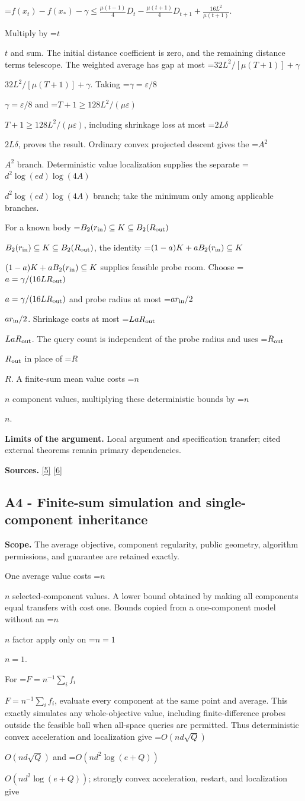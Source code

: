 \documentclass[10pt,a4paper]{article}
\newcommand{\AtlasMath}[1]{\par\begingroup\centering\setbox0=\hbox{$\displaystyle #1$}\ifdim\wd0>1.4\linewidth\typeout{ATLAS WIDE FORMULA: \the\wd0}\fi\ifdim\wd0>\linewidth\resizebox{\linewidth}{!}{\box0}\else\box0\fi\par\endgroup}
\newcommand{\AtlasInlineMath}[1]{\begingroup\setbox0=\hbox{$#1$}\ifdim\wd0>.4\linewidth\endgroup\AtlasMath{#1}\else\endgroup$#1$\fi}
\begin{document}
\AtlasMath{f(x_t)-f(x_*)-\gamma\le\frac{\mu(t-1)}4D_t-\frac{\mu(t+1)}4D_{t+1}+\frac{16L^2}{\mu(t+1)}.}

Multiply by \AtlasInlineMath{t} and sum. The initial distance coefficient is zero, and the remaining distance terms telescope. The weighted average has gap at most \AtlasInlineMath{32L^2/[\mu(T+1)]+\gamma}. Taking \AtlasInlineMath{\gamma=\varepsilon/8} and \AtlasInlineMath{T+1\ge128L^2/(\mu\varepsilon)}, including shrinkage loss at most \AtlasInlineMath{2L\delta}, proves the result. Ordinary convex projected descent gives the \AtlasInlineMath{A^2} branch. Deterministic value localization supplies the separate \AtlasInlineMath{d^2\log(ed)\log(4A)} branch; take the minimum only among applicable branches.

For a known body \AtlasInlineMath{B_2(r_{\rm in})\subseteq K\subseteq B_2(R_{\rm out})}, the identity \AtlasInlineMath{(1-a)K+aB_2(r_{\rm in})\subseteq K} supplies feasible probe room. Choose \AtlasInlineMath{a=\gamma/(16LR_{\rm out})} and probe radius at most \AtlasInlineMath{ar_{\rm in}/2}. Shrinkage costs at most \AtlasInlineMath{LaR_{\rm out}}. The query count is independent of the probe radius and uses \AtlasInlineMath{R_{\rm out}} in place of \AtlasInlineMath{R}. A finite-sum mean value costs \AtlasInlineMath{n} component values, multiplying these deterministic bounds by \AtlasInlineMath{n}.

\textbf{Limits of the argument.} Local argument and specification transfer; cited external theorems remain primary dependencies.

\textbf{Sources.} \href{https://arxiv.org/html/2607.16558v2}{[5]} \href{https://www.mathnet.ru/php/archive.phtml?jrnid=mzm&option_lang=eng&paperid=1697&wshow=paper}{[6]}

\subsection{A4 - Finite-sum simulation and single-component inheritance}
\textbf{Scope.} The average objective, component regularity, public geometry, algorithm permissions, and guarantee are retained exactly.

One average value costs \AtlasInlineMath{n} selected-component values. A lower bound obtained by making all components equal transfers with cost one. Bounds copied from a one-component model without an \AtlasInlineMath{n} factor apply only on \AtlasInlineMath{n=1}.

For \AtlasInlineMath{F=n^{-1}\sum_i f_i}, evaluate every component at the same point and average. This exactly simulates any whole-objective value, including finite-difference probes outside the feasible ball when all-space queries are permitted. Thus deterministic convex acceleration and localization give \AtlasInlineMath{O(nd\sqrt Q)} and \AtlasInlineMath{O(nd^2\log(e+Q))}; strongly convex acceleration, restart, and localization give
\end{document}
